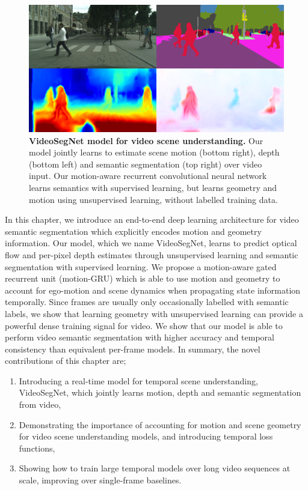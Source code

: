 \begin{figure}[t]
\begin{center}
\includegraphics[width=\columnwidth,trim={7mm 12mm 7mm 0},clip]{videosegnet.png}
\end{center}
   \caption[VideoSegNet model for video scene understanding.]{\textbf{VideoSegNet model for video scene understanding.} Our model jointly learns to estimate scene motion (bottom right), depth (bottom left) and semantic segmentation (top right) over video input. Our motion-aware recurrent convolutional neural network learns semantics with supervised learning, but learns geometry and motion using unsupervised learning, without labelled training data.}
\end{figure}

In this chapter, we introduce an end-to-end deep learning architecture for video semantic segmentation which explicitly encodes motion and geometry information. Our model, which we name VideoSegNet, learns to predict optical flow and per-pixel depth estimates through unsupervised learning and semantic segmentation with supervised learning. We propose a motion-aware gated recurrent unit (motion-GRU) which is able to use motion and geometry to account for ego-motion and scene dynamics when propagating state information temporally. Since frames are usually only occasionally labelled with semantic labels, we show that learning geometry with unsupervised learning can provide a powerful dense training signal for video. We show that our model is able to perform video semantic segmentation with higher accuracy and temporal consistency than equivalent per-frame models. In summary, the novel contributions of this chapter are;
\begin{enumerate}
\item Introducing a real-time model for temporal scene understanding, VideoSegNet, which jointly learns motion, depth and semantic segmentation from video,
\item Demonstrating the importance of accounting for motion and scene geometry for video scene understanding models, and introducing temporal loss functions,
\item Showing how to train large temporal models over long video sequences at scale, improving over single-frame baselines.
\end{enumerate}

